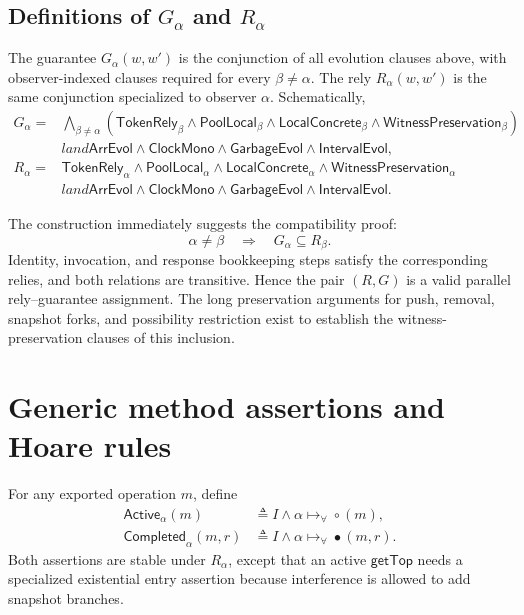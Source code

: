 \documentclass[11pt]{article}
\theoremstyle{definition}
\theoremstyle{remark}
\newcommand{\GetTop}{\mathsf{getTop}}
\newcommand{\alltok}[2]{#1\mathrel{\mapsto_{\forall}}#2}
\begin{document}
\subsection{Definitions of \texorpdfstring{\(G_\alpha\) and \(R_\alpha\)}{G and R}}

The guarantee \(G_\alpha(w,w')\) is the conjunction of all evolution clauses
above, with observer-indexed clauses required for every
\(\beta\ne\alpha\).  The rely \(R_\alpha(w,w')\) is the same conjunction
specialized to observer \(\alpha\).  Schematically,
\[
\begin{split}
G_\alpha={}&
 \bigwedge_{\beta\ne\alpha}
  (\mathsf{TokenRely}_\beta\land\mathsf{PoolLocal}_\beta
   \land\mathsf{LocalConcrete}_\beta
   \land\mathsf{WitnessPreservation}_\beta)
\\&{}land\mathsf{ArrEvol}\land\mathsf{ClockMono}
 \land\mathsf{GarbageEvol}\land\mathsf{IntervalEvol},\\
R_\alpha={}&
 \mathsf{TokenRely}_\alpha\land\mathsf{PoolLocal}_\alpha
 \land\mathsf{LocalConcrete}_\alpha
 \land\mathsf{WitnessPreservation}_\alpha
\\&{}land\mathsf{ArrEvol}\land\mathsf{ClockMono}
 \land\mathsf{GarbageEvol}\land\mathsf{IntervalEvol}.
\end{split}
\]

The construction immediately suggests the compatibility proof:
\[
  \alpha\ne\beta\quad\Longrightarrow\quad G_\alpha\subseteq R_\beta.
\]
Identity, invocation, and response bookkeeping steps satisfy the corresponding
relies, and both relations are transitive.  Hence the pair \((R,G)\) is a valid
parallel rely--guarantee assignment.  The long preservation arguments for
push, removal, snapshot forks, and possibility restriction exist to establish
the witness-preservation clauses of this inclusion.

\section{Generic method assertions and Hoare rules}

For any exported operation \(m\), define
\[
\begin{aligned}
\mathsf{Active}_\alpha(m)&\triangleq
 I\land\alltok{\alpha}{\circ(m)},\\
\mathsf{Completed}_\alpha(m,r)&\triangleq
 I\land\alltok{\alpha}{\bullet(m,r)}.
\end{aligned}
\]
Both assertions are stable under \(R_\alpha\), except that an active
\(\GetTop\) needs a specialized existential entry assertion because
interference is allowed to add snapshot branches.
\end{document}
